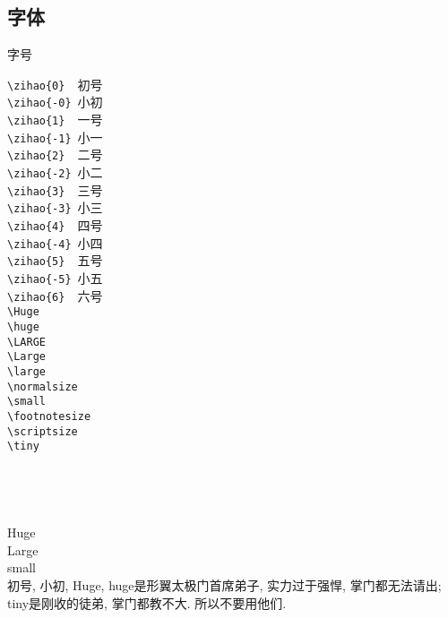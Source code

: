 \documentclass[hyperref,UTF8,11pt,CJK]{beamer}
\begin{document}
\subsection{字体}
\begin{frame}[fragile]{字号}
	\begin{multicols}{3}
		\verb|\zihao{0} |~初号\\
		\verb|\zihao{-0}|~小初\\
		\verb|\zihao{1} |~一号\\
		\verb|\zihao{-1}|~小一\\
		\verb|\zihao{2} |~二号\\
		\verb|\zihao{-2}|~小二\\
		\verb|\zihao{3} |~三号\\
		\verb|\zihao{-3}|~小三\\
		\verb|\zihao{4} |~四号\\
		\verb|\zihao{-4}|~小四\\
		\verb|\zihao{5} |~五号\\
		\verb|\zihao{-5}|~小五\\
		\verb|\zihao{6} |~六号\\
		\newpage
		\verb|\Huge|\\
		\verb|\huge|\\
		\verb|\LARGE|\\
		\verb|\Large|\\
		\verb|\large|\\
		\verb|\normalsize|\\
		\verb|\small|\\
		\verb|\footnotesize|\\
		\verb|\scriptsize|\\
		\verb|\tiny|\\
		\newpage
		\\
		\\
		\\
		\\
		\Huge{Huge}\\
		\Large{Large}\\
		\small{small}\\
		\footnotesize 初号, 小初, Huge, huge是形翼太极门首席弟子, 实力过于强悍, 掌门都无法请出; tiny是刚收的徒弟, 掌门都教不大. 所以不要用他们.
	\end{multicols}
\end{frame}
	
\end{document}
